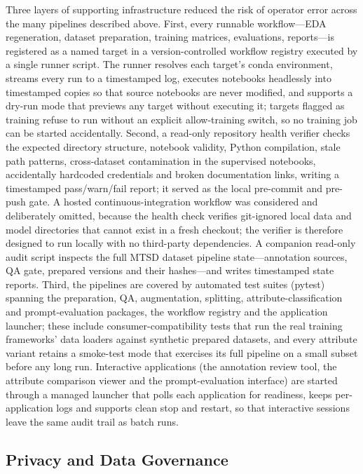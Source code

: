 Three layers of supporting infrastructure reduced the risk of operator error across the many pipelines described above. First, every runnable workflow---EDA regeneration, dataset preparation, training matrices, evaluations, reports---is registered as a named target in a version-controlled workflow registry executed by a single runner script. The runner resolves each target's conda environment, streams every run to a timestamped log, executes notebooks headlessly into timestamped copies so that source notebooks are never modified, and supports a dry-run mode that previews any target without executing it; targets flagged as training refuse to run without an explicit allow-training switch, so no training job can be started accidentally. Second, a read-only repository health verifier checks the expected directory structure, notebook validity, Python compilation, stale path patterns, cross-dataset contamination in the supervised notebooks, accidentally hardcoded credentials and broken documentation links, writing a timestamped pass/warn/fail report; it served as the local pre-commit and pre-push gate. A hosted continuous-integration workflow was considered and deliberately omitted, because the health check verifies git-ignored local data and model directories that cannot exist in a fresh checkout; the verifier is therefore designed to run locally with no third-party dependencies. A companion read-only audit script inspects the full MTSD dataset pipeline state---annotation sources, QA gate, prepared versions and their hashes---and writes timestamped state reports. Third, the pipelines are covered by automated test suites (pytest) spanning the preparation, QA, augmentation, splitting, attribute-classification and prompt-evaluation packages, the workflow registry and the application launcher; these include consumer-compatibility tests that run the real training frameworks' data loaders against synthetic prepared datasets, and every attribute variant retains a smoke-test mode that exercises its full pipeline on a small subset before any long run. Interactive applications (the annotation review tool, the attribute comparison viewer and the prompt-evaluation interface) are started through a managed launcher that polls each application for readiness, keeps per-application logs and supports clean stop and restart, so that interactive sessions leave the same audit trail as batch runs.

\subsection{Privacy and Data Governance}

